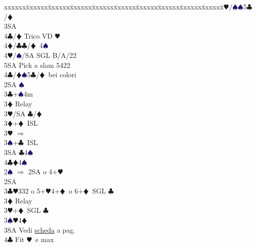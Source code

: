 \documentclass[a4paper,italian]{article}
\newcommand{\BC}{\textcolor{OliveGreen}{$\clubsuit$}}
\newcommand{\BD}{\textcolor{RedOrange}{$\vardiamondsuit$}}
\newcommand{\BH}{\textcolor{Red2}{$\varheartsuit${}}}
\newcommand{\BS}{\textcolor{MidnightBlue}{$\spadesuit${}}}
\newenvironment{bidtable}
{\begin{tabbing}

    xxxxxx\=xxxxxx\=xxxxxx\=xxxxxx\=xxxxxx\=xxxxxx\=xxxxxx\=xxxxxx\=xxxxxx\=xxxxxx\=\kill}
{\end{tabbing} }%
\begin{document}
\begin{multicols}{2}
\begin{bidtable}
                                            3\BH/\BS {}\BS 5\BC /\BD \+\\
                                            3SA\+\\
                                            4\BC/\BD \> Trico VD \BH \\
                                            4\BD/\BC {}\BC /\BD\ 4\BS \\
                                            4\BH/\BS/SA \>\> SGL B/A/22\\
                                            5SA \> Pick a slam 5422\-\-\\
                                            4\BC/\BD {}\BS 5\BC /\BD\ bei colori\-\\
                                            2SA \BS \+\\
                                            3\BC {}+\BS 4m\+\\
                                            3\BD \> Relay\+\\
                                            3\BH/SA \BC /\BD \-\-\\
                                            3\BD {}+\BD\ ISL\\
                                            3\BH \> $\Rightarrow$\\
                                            3\BS {}+\BC\ ISL\\
                                            3SA \BC 4\BS \\
                                            4\BC {}\BD 4\BS \-\-\\
                                            2\BS \> $\Rightarrow$ 2SA o 4+\BH \+\\
                                            2SA\+\\
                                            3\BC {}\BH 332 o 5+\BH 4+\BD\ o 6+\BD\ SGL \BC \+\\
                                            3\BD \> Relay\+\\
                                            3\BH {}+\BD\ SGL \BC \\
                                            3\BS {}\BH 4\BD \+\\
                                            3SA\> Vedi \hyperref[Riapertura3SA]{scheda} a pag. \pageref{Riapertura3SA}\\
                                            4\BC\> Fit \BH\ e max\\

\end{bidtable}
\end{multicols}
\end{document}
